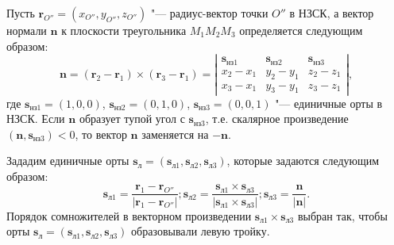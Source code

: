 \documentclass[../main.tex]{subfiles}
\begin{document}
Пусть $\mathbf{r}_{O''} = \left(x_{O''}, y_{O''}, z_{O''}\right)$ "--- радиус-вектор точки $O''$ в НЗСК, а вектор нормали $\mathbf{n}$ к плоскости треугольника $M_1 M_2 M_3$  определяется следующим образом:
\begin{equation*}
  \mathbf{n} = \left(\mathbf{r}_2 - \mathbf{r}_1\right) \times \left(\mathbf{r}_3 - \mathbf{r}_1\right) = \left| \begin{matrix}
    \mathbf{s}_{\text{нз}1} & \mathbf{s}_{\text{нз}2} & \mathbf{s}_{\text{нз}3} \\
    x_2 - x_1 & y_2 - y_1 & z_2 - z_1 \\
    x_3 - x_1 & y_3 - y_1 & z_3 - z_1
  \end{matrix}\right|,
\end{equation*}
где $\mathbf{s}_{\text{нз}1} = \left(1, 0, 0\right)$, $\mathbf{s}_{\text{нз}2} = \left(0, 1, 0\right)$, $\mathbf{s}_{\text{нз}3} = \left(0, 0, 1\right)$ "--- единичные орты в НЗСК. Если $\mathbf{n}$ образует тупой угол с $\mathbf{s}_{\text{нз}3}$, т.е. скалярное произведение  $\left(\mathbf{n}, \mathbf{s}_{\text{нз}3}\right) < 0$, то вектор $\mathbf{n}$ заменяется на $-\mathbf{n}$.

Зададим единичные орты $\mathbf{s}_\text{л} = \left(\mathbf{s}_{\text{л}1}, \mathbf{s}_{\text{л}2}, \mathbf{s}_{\text{л}3}\right)$, которые задаются следующим образом:
\begin{equation*}
  \mathbf{s}_{\text{л}1} = \frac{\mathbf{r}_1 - \mathbf{r}_{O''}}{\left|\mathbf{r}_1 - \mathbf{r}_{O''}\right|};
  \mathbf{s}_{\text{л}2} = \frac{\mathbf{s}_{\text{л}1} \times \mathbf{s}_{\text{л}3}}{\left|\mathbf{s}_{\text{л}1} \times \mathbf{s}_{\text{л}3}\right|};
  \mathbf{s}_{\text{л}3} = \frac{\mathbf{n}}{\left|\mathbf{n}\right|}.
\end{equation*}
Порядок сомножителей в векторном произведении $\mathbf{s}_{\text{л}1} \times \mathbf{s}_{\text{л}3}$ выбран так, чтобы орты $\mathbf{s}_\text{л} = \left(\mathbf{s}_{\text{л}1}, \mathbf{s}_{\text{л}2}, \mathbf{s}_{\text{л}3}\right)$ образовывали левую тройку.
\end{document}
